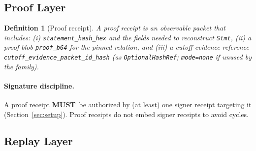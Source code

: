 \documentclass[11pt]{article}
\newcommand{\MUST}{\textbf{MUST}}
\newtheorem{definition}{Definition}
\begin{document}
\subsection{Proof Layer}

\begin{definition}[Proof receipt]
A proof receipt is an observable packet that includes:
(i) \texttt{statement\_hash\_hex} and the fields needed to reconstruct \texttt{Stmt},
(ii) a proof blob \texttt{proof\_b64} for the pinned relation, and
(iii) a cutoff-evidence reference \texttt{cutoff\_evidence\_packet\_id\_hash} (as \texttt{OptionalHashRef}; \texttt{mode=none} if unused by the family).
\end{definition}

\paragraph{Signature discipline.}
A proof receipt \MUST\ be authorized by (at least) one signer receipt targeting it (Section~\ref{sec:setup}). Proof receipts do not embed signer receipts to avoid cycles.

\subsection{Replay Layer}
\end{document}
